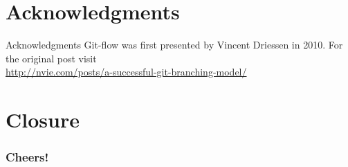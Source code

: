 \documentclass[
14pt,
aspectratio=169,
usenames,
dvipsnames,
x11names]{beamer}
\begin{document}
\section{Acknowledgments}

\begin{frame}{Acknowledgments}
  Git-flow was first presented by \alert{Vincent Driessen} in 2010.
  \vfill
  For the original post visit\\
  {\small\url{http://nvie.com/posts/a-successful-git-branching-model/}}
\end{frame}

\section{Closure}
{
\begin{frame}[noframenumbering]
 \frametitle{\textbf{Cheers!}}
 \centering
 \titlepage
\end{frame}
}

\end{document}
